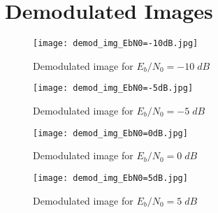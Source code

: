 \documentclass{article}
\begin{document}
\section{Demodulated Images}
{   
    \begin{figure}[h]
    \centering
    \texttt{[image: demod\_img\_EbN0=-10dB.jpg]}
    \caption{Demodulated image for \(E_b/N_0 = -10\; dB\)}
    \end{figure}
    
     \begin{figure}[!htb]
    \centering
    \texttt{[image: demod\_img\_EbN0=-5dB.jpg]}
    \caption{Demodulated image for \(E_b/N_0 = -5\;dB\)}
    \end{figure}
    
     \begin{figure}[!htb]
    \centering
    \texttt{[image: demod\_img\_EbN0=0dB.jpg]}
    \caption{Demodulated image for \(E_b/N_0 = 0\;dB\)}
    \end{figure}
    
     \begin{figure}[!htb]
    \centering
    \texttt{[image: demod\_img\_EbN0=5dB.jpg]}
    \caption{Demodulated image for \(E_b/N_0 = 5\;dB\)}
    \end{figure}
}
\end{document}

